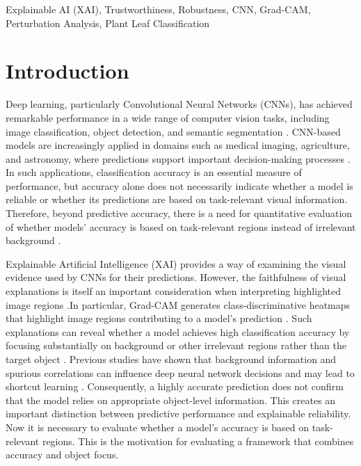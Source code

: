 \documentclass[a4paper,fleqn]{cas-dc}
\begin{document}

\begin{keywords}
Explainable AI (XAI), Trustworthiness, Robustness, CNN, Grad-CAM, Perturbation Analysis, Plant Leaf Classification
\end{keywords}

\maketitle

\section{Introduction}

Deep learning, particularly Convolutional Neural Networks (CNNs), has achieved remarkable performance in a wide range of computer vision tasks, including image classification, object detection, and semantic segmentation \cite{r1}. CNN-based models are increasingly applied in domains such as medical imaging, agriculture, and astronomy, where predictions support important decision-making processes \cite{r2}\cite{r3}\cite{r4}. In such applications, classification accuracy is an essential measure of performance, but accuracy alone does not necessarily indicate whether a model is reliable or whether its predictions are based on task-relevant visual information. Therefore, beyond predictive accuracy, there is a need for quantitative evaluation of whether models' accuracy is based on task-relevant regions instead of irrelevant background \cite{r4.1}.

Explainable Artificial Intelligence (XAI) provides a way of examining the visual evidence used by CNNs for their predictions. However, the faithfulness of visual explanations is itself an important consideration when interpreting highlighted image regions \cite{r4.2}.In particular, Grad-CAM generates class-discriminative heatmaps that highlight image regions contributing to a model's prediction \cite{r5}. Such explanations can reveal whether a model achieves high classification accuracy by focusing substantially on background or other irrelevant regions rather than the target object \cite{r6,r7}. Previous studies have shown that background information and spurious correlations can influence deep neural network decisions and may lead to shortcut learning \cite{r8}\cite{r8.1}\cite{r8.2}. Consequently, a highly accurate prediction does not confirm that the model relies on appropriate object-level information. This creates an important distinction between predictive performance and explainable reliability. Now it is necessary to evaluate whether a model's accuracy is based on task-relevant regions. This is the motivation for evaluating a framework that combines accuracy and object focus.
\end{document}
